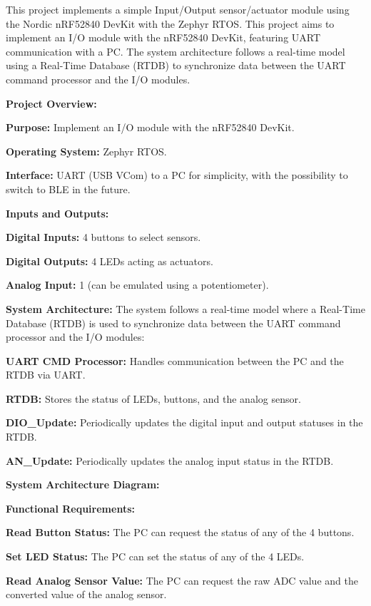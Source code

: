 This project implements a simple Input/\+Output sensor/actuator module using the Nordic n\+RF52840 Dev\+Kit with the Zephyr RTOS. This project aims to implement an I/O module with the n\+RF52840 Dev\+Kit, featuring UART communication with a PC. The system architecture follows a real-\/time model using a Real-\/\+Time Database (RTDB) to synchronize data between the UART command processor and the I/O modules.

{\bfseries{Project Overview\+:}}
\begin{DoxyItemize}
\item {\bfseries{Purpose\+:}} Implement an I/O module with the n\+RF52840 Dev\+Kit.
\item {\bfseries{Operating System\+:}} Zephyr RTOS.
\item {\bfseries{Interface\+:}} UART (USB VCom) to a PC for simplicity, with the possibility to switch to BLE in the future.
\end{DoxyItemize}

{\bfseries{Inputs and Outputs\+:}}
\begin{DoxyItemize}
\item {\bfseries{Digital Inputs\+:}} 4 buttons to select sensors.
\item {\bfseries{Digital Outputs\+:}} 4 LEDs acting as actuators.
\item {\bfseries{Analog Input\+:}} 1 (can be emulated using a potentiometer).
\end{DoxyItemize}

{\bfseries{System Architecture\+:}} The system follows a real-\/time model where a Real-\/\+Time Database (RTDB) is used to synchronize data between the UART command processor and the I/O modules\+:
\begin{DoxyItemize}
\item {\bfseries{UART CMD Processor\+:}} Handles communication between the PC and the RTDB via UART.
\item {\bfseries{RTDB\+:}} Stores the status of LEDs, buttons, and the analog sensor.
\item {\bfseries{DIO\+\_\+\+Update\+:}} Periodically updates the digital input and output statuses in the RTDB.
\item {\bfseries{AN\+\_\+\+Update\+:}} Periodically updates the analog input status in the RTDB.
\end{DoxyItemize}

{\bfseries{System Architecture Diagram\+:}}~\newline
 

{\bfseries{Functional Requirements\+:}}
\begin{DoxyItemize}
\item {\bfseries{Read Button Status\+:}} The PC can request the status of any of the 4 buttons.
\item {\bfseries{Set LED Status\+:}} The PC can set the status of any of the 4 LEDs.
\item {\bfseries{Read Analog Sensor Value\+:}} The PC can request the raw ADC value and the converted value of the analog sensor.
\end{DoxyItemize}

